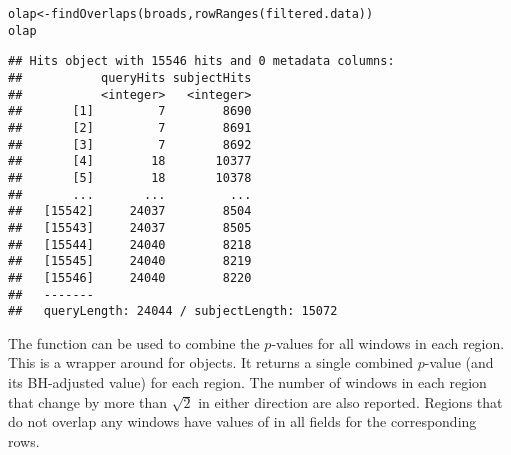 \documentclass{report}\usepackage[]{graphicx}\usepackage[usenames,dvipsnames]{color}
\newcommand{\hlopt}[1]{\textcolor[rgb]{0,0,0}{#1}}%
\newcommand{\hlstd}[1]{\textcolor[rgb]{0.251,0.251,0.251}{#1}}%
\newcommand{\hlkwb}[1]{\textcolor[rgb]{0,0,0}{#1}}%
\newcommand{\hlkwd}[1]{\textcolor[rgb]{0.878,0.439,0.125}{#1}}%
\newenvironment{knitrout}{}{} %
\begin{document}
\begin{knitrout}
\color{fgcolor}\begin{kframe}
\begin{alltt}
\hlstd{olap} \hlkwb{<-} \hlkwd{findOverlaps}\hlstd{(broads,} \hlkwd{rowRanges}\hlstd{(filtered.data))}
\hlstd{olap}
\end{alltt}
\begin{verbatim}
## Hits object with 15546 hits and 0 metadata columns:
##           queryHits subjectHits
##           <integer>   <integer>
##       [1]         7        8690
##       [2]         7        8691
##       [3]         7        8692
##       [4]        18       10377
##       [5]        18       10378
##       ...       ...         ...
##   [15542]     24037        8504
##   [15543]     24037        8505
##   [15544]     24040        8218
##   [15545]     24040        8219
##   [15546]     24040        8220
##   -------
##   queryLength: 24044 / subjectLength: 15072
\end{verbatim}
\end{kframe}
\end{knitrout}

The  function can be used to combine the $p$-values for all windows in each region. 
This is a wrapper around  for  objects.
It returns a single combined $p$-value (and its BH-adjusted value) for each region. 
The number of windows in each region that change by more than $\sqrt{2}$ in either direction are also reported.
Regions that do not overlap any windows have values of  in all fields for the corresponding rows.

\begin{knitrout}
\color{fgcolor}
\end{knitrout}
\end{document}
